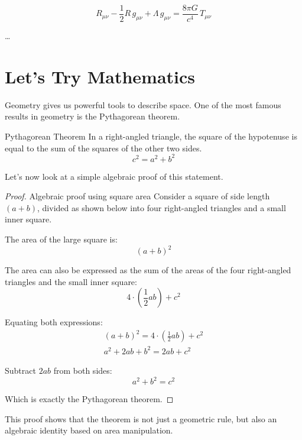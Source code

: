 \documentclass[a5paper,12pt]{book}							%
\newenvironment{remember}
{\begin{tcolorbox}[colframe=red, colback=AliceBlue]}
	{\end{tcolorbox}}
\newenvironment{important}
{\begin{tcolorbox}[colframe=Orange, colback=AliceBlue]}
	{\end{tcolorbox}}
\begin{document}
	\begin{important}
		\[R_{\mu\nu} - \frac{1}{2}R\,g_{\mu\nu} + \Lambda\, g_{\mu\nu} = \frac{8\pi G}{c^4}\,T_{\mu\nu}\]
	\end{important}
	
	\dots
	
	\chapter{Let’s Try Mathematics}
	
	Geometry gives us powerful tools to describe space. One of the most famous results in geometry is the Pythagorean theorem.
	
	\begin{define}{Pythagorean Theorem}{}
		In a right-angled triangle, the square of the hypotenuse is equal to the sum of the squares of the other two sides.
		\[
		c^2 = a^2 + b^2
		\]
	\end{define}
	
	Let’s now look at a simple algebraic proof of this statement.
	
	\begin{proof}{Algebraic proof using square area}{}
		Consider a square of side length $(a + b)$, divided as shown below into four right-angled triangles and a small inner square.
		
		The area of the large square is:
		\[
		(a + b)^2
		\]
		
		The area can also be expressed as the sum of the areas of the four right-angled triangles and the small inner square:
		\[
		4 \cdot \left(\frac{1}{2}ab\right) + c^2
		\]
		
		Equating both expressions:
		\begin{align*}
			(a + b)^2 = 4 \cdot \left(\frac{1}{2}ab\right) + c^2\\
			a^2 + 2ab + b^2 = 2ab + c^2
		\end{align*}
		
		Subtract $2ab$ from both sides:
		\[
		a^2 + b^2 = c^2
		\]
		
		Which is exactly the Pythagorean theorem.
	\end{proof}
	
	\begin{remember}
		This proof shows that the theorem is not just a geometric rule, but also an algebraic identity based on area manipulation.
	\end{remember}
	
	{\small \printindex}
	
\end{document}
